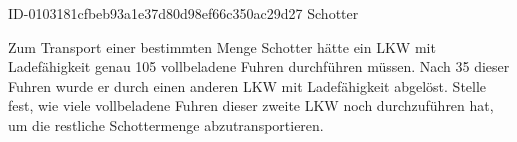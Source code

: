 \begin{exercise}
      {ID-0103181cfbeb93a1e37d80d98ef66c350ac29d27}
      {Schotter}
  \ifproblem\problem\par
    Zum Transport einer bestimmten Menge Schotter hätte ein LKW
    mit  Ladefähigkeit genau 105 vollbeladene Fuhren
    durchführen müssen. Nach 35 dieser Fuhren wurde er durch
    einen anderen LKW mit  Ladefähigkeit abgelöst.
    Stelle fest, wie viele vollbeladene Fuhren dieser zweite
    LKW noch durchzuführen hat, um die restliche Schottermenge
    abzutransportieren.
  \fi
\end{exercise}
